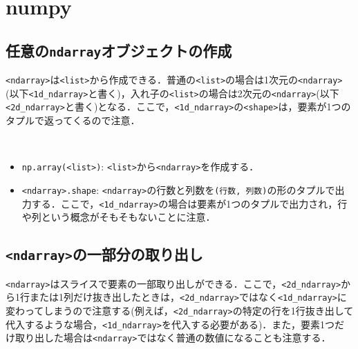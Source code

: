 \section{numpy}

\subsection{任意の\texttt{ndarray}オブジェクトの作成}

\texttt{<ndarray>}は\texttt{<list>}から作成できる．普通の\texttt{<list>}の場合は1次元の\texttt{<ndarray>}(以下\texttt{<1d\_ndarray>}と書く)，入れ子の\texttt{<list>}の場合は2次元の\texttt{<ndarray>}(以下\texttt{<2d\_ndarray>}と書く)となる．ここで，\texttt{<1d\_ndarray>}の\texttt{<shape>}は，要素が1つのタプルで返ってくるので注意．

\begin{gram}　
\begin{itemize}
\item \texttt{np.array(<list>)}: \texttt{<list>}から\texttt{<ndarray>}を作成する．
\item \texttt{<ndarray>.shape}: \texttt{<ndarray>}の行数と列数を\texttt{(行数, 列数)}の形のタプルで出力する．ここで，\texttt{<1d\_ndarray>}の場合は要素が1つのタプルで出力され，行や列という概念がそもそもないことに注意．

\end{itemize}
\end{gram}

\begin{cod}[\texttt{num1.py}]　
}]{code/num1.py}
\vspace{-7pt}
\begin{lstlisting}
array_1d=
[1 3 5 9]
shape=(4,)
type=<class 'numpy.ndarray'>

array_2d=
[[ 1  3  5]
 [ 2  4  6]
 [ 3  6  9]
 [ 5 10 15]]
shape=(4, 3)
type=<class 'numpy.ndarray'>
\end{lstlisting}
\end{cod}
\vspace{-10pt}

\subsection{\texttt{<ndarray>}の一部分の取り出し}

\texttt{<ndarray>}はスライスで要素の一部取り出しができる．ここで，\texttt{<2d\_ndarray>}から1行または1列だけ抜き出したときは，\texttt{<2d\_ndarray>}ではなく\texttt{<1d\_ndarray>}に変わってしまうので注意する(例えば，\texttt{<2d\_ndarray>}の特定の行を1行抜き出して代入するような場合，\texttt{<1d\_ndarray>}を代入する必要がある)．また，要素1つだけ取り出した場合は\texttt{<ndarray>}ではなく普通の数値になることも注意する．


